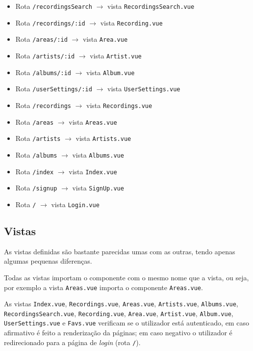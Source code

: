 \documentclass{article}
\begin{document}
\begin{itemize}
    \item Rota \texttt{/recordingsSearch} $\to$ vista \texttt{RecordingsSearch.vue}
    \item Rota \texttt{/recordings/:id} $\to$ vista \texttt{Recording.vue}
    \item Rota \texttt{/areas/:id} $\to$ vista \texttt{Area.vue}
    \item Rota \texttt{/artists/:id} $\to$ vista \texttt{Artist.vue}
    \item Rota \texttt{/albums/:id} $\to$ vista \texttt{Album.vue}
    \item Rota \texttt{/userSettings/:id} $\to$ vista \texttt{UserSettings.vue}
    \item Rota \texttt{/recordings} $\to$ vista \texttt{Recordings.vue}
    \item Rota \texttt{/areas} $\to$ vista \texttt{Areas.vue}
    \item Rota \texttt{/artists} $\to$ vista \texttt{Artists.vue}
    \item Rota \texttt{/albums} $\to$ vista \texttt{Albums.vue}
    \item Rota \texttt{/index} $\to$ vista \texttt{Index.vue}
    \item Rota \texttt{/signup} $\to$ vista \texttt{SignUp.vue}
    \item Rota \texttt{/} $\to$ vista \texttt{Login.vue}
\end{itemize}

\subsection{Vistas}

As vistas definidas são bastante parecidas umas com as outras, tendo apenas algumas pequenas diferenças. 

Todas as vistas importam o componente com o mesmo nome que a vista, ou seja, por exemplo a vista \texttt{Areas.vue} importa o componente \texttt{Areas.vue}.

As vistas \texttt{Index.vue}, \texttt{Recordings.vue}, \texttt{Areas.vue}, \texttt{Artists.vue}, \texttt{Albums.vue}, \texttt{RecordingsSearch.vue}, \texttt{Recording.vue}, \texttt{Area.vue}, \texttt{Artist.vue}, \texttt{Album.vue}, \texttt{UserSettings.vue} e \texttt{Favs.vue} verificam se o utilizador está autenticado, em caso afirmativo é feito a renderização da páginas; em caso negativo o utilizador é redirecionado para a página de \textit{login} (rota \texttt{/}).
\end{document}
